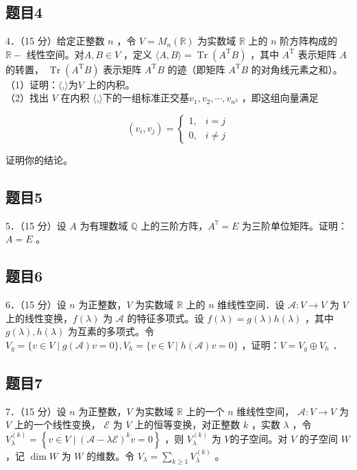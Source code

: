 \documentclass{article}
\begin{document}
\subsection{题目4}
4．（15 分）给定正整数 \(n\) ，令 \(V=M_{n}(\mathbb{R})\) 为实数域 \(\mathbb{R}\) 上的 \(n\) 阶方阵构成的 \(\mathbb{R}-\) 线性空间。对\(A, B \in V\) ，定义 \(\langle A, B\rangle=\operatorname{Tr}\left(A^{\mathrm{T}} B\right)\) ，其中 \(A^{\mathrm{T}}\) 表示矩阵 \(A\) 的转置， \(\operatorname{Tr}\left(A^{\mathrm{T}} B\right)\) 表示矩阵 \(A^{\mathrm{T}} B\) 的迹（即矩阵 \(A^{\mathrm{T}} B\) 的对角线元素之和）。\\
（1）证明：\(\langle\),\(\rangle 为 V\) 上的内积。\\
（2）找出 \(V\) 在内积 \(\langle\),\(\rangle 下的一组标准正交基 v_{1}, v_{2}, \cdots, v_{n^{2}}\) ，即这组向量满足

\[
\left(v_{i}, v_{j}\right)= \begin{cases}1, & i=j \\ 0, & i \neq j\end{cases}
\]

证明你的结论。

\subsection{题目5}
5．（15 分）设 \(A\) 为有理数域 \(\mathbb{Q}\) 上的三阶方阵，\(A^{7}=E\) 为三阶单位矩阵。证明：\(A=E\) 。

\subsection{题目6}
6．（15 分）设 \(n\) 为正整数，\(V\) 为实数域 \(\mathbb{R}\) 上的 \(n\) 维线性空间．设 \(\mathcal{A}: V \rightarrow V\) 为 \(V\) 上的线性变换，\(f(\lambda)\) 为 \(\mathcal{A}\) 的特征多项式。设 \(f(\lambda)=g(\lambda) h(\lambda)\) ，其中 \(g(\lambda), h(\lambda)\) 为互素的多项式。令\(V_{g}=\{v \in V \mid g(\mathcal{A}) v=0\}, V_{h}=\{v \in V \mid h(\mathcal{A}) v=0\}\) ，证明：\(V=V_{g} \oplus V_{h}\) ．

\subsection{题目7}
7．（15 分）设 \(n\) 为正整数，\(V\) 为实数域 \(\mathbb{R}\) 上的一个 \(n\) 维线性空间， \(\mathcal{A}: V \rightarrow V\) 为 \(V\) 上的一个线性变换， \(\mathcal{E}\) 为 \(V\) 上的恒等变换，对正整数 \(k\) ，实数 \(\lambda\) ，令 \(V_{\lambda}^{(k)}=\left\{v \in V \mid(\mathcal{A}-\lambda \mathcal{E})^{k} v=0\right\}\) ，则 \(V_{\lambda}^{(k)}\) 为 \(V\)的子空间。对 \(V\) 的子空间 \(W\) ，记 \(\operatorname{dim} W\) 为 \(W\) 的维数。令 \(V_{\lambda}=\sum_{k \geq 1} V_{\lambda}^{(k)}\) 。
\end{document}
